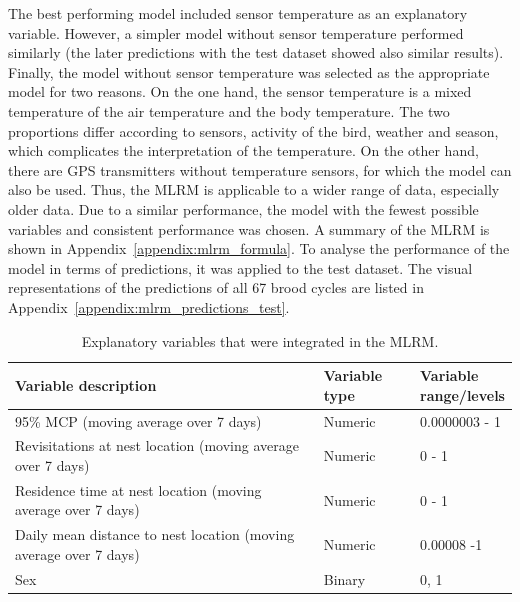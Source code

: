 The best performing model included sensor temperature as an explanatory variable. However, a simpler model without sensor temperature performed similarly (the later predictions with the test dataset showed also similar results). Finally, the model without sensor temperature was selected as the appropriate model for two reasons. On the one hand, the sensor temperature is a mixed temperature of the air temperature and the body temperature. The two proportions differ according to sensors, activity of the bird, weather and season, which complicates the interpretation of the temperature. On the other hand, there are GPS transmitters without temperature sensors, for which the model can also be used. Thus, the MLRM is applicable to a wider range of data, especially older data. Due to a similar performance, the model with the fewest possible variables and consistent performance was chosen. A summary of the MLRM is shown in Appendix~\ref{appendix:mlrm_formula}. To analyse the performance of the model in terms of predictions, it was applied to the test dataset. The visual representations of the predictions of all 67 brood cycles are listed in Appendix~\ref{appendix:mlrm_predictions_test}.

\begin{table}[H]
\begin{center}
\caption[Explanatory variables of the MLRM]{Explanatory variables that were integrated in the MLRM.}
\label{table:mlrm_variables}
\begin{tabular}{| p{6cm} | p{2.5cm} | p{2.5cm} |}
\cline{1-3}
\textbf{Variable description} & \textbf{Variable type} & \textbf{Variable \newline range/levels} \\
\hline
95\% MCP \newline (moving average over 7 days) & Numeric & 0.0000003 - 1\\ 
\hline
Revisitations at nest location \newline (moving average over 7 days) & Numeric & 0 - 1 \\
\hline
Residence time at nest location \newline (moving average over 7 days) & Numeric & 0 - 1\\
\hline
Daily mean distance to nest location \newline (moving average over 7 days) & Numeric & 0.00008 -1\\
\hline
Sex & Binary & 0, 1\\
\hline
\end{tabular}
\end{center}
\end{table}



